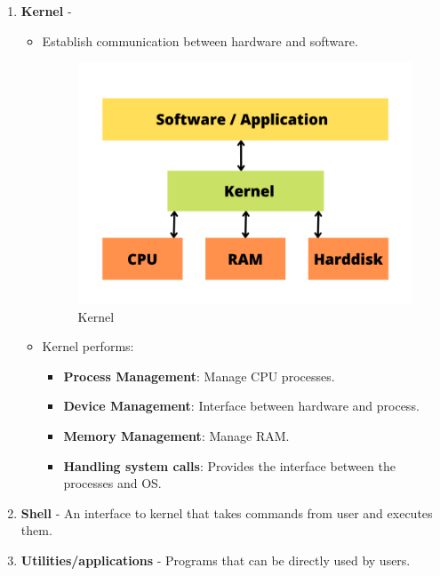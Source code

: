 \begin{flushleft}
	\begin{enumerate} 
		\item \textbf{Kernel} - 
		\begin{itemize}
			\item Establish communication between hardware and software.
			\begin{figure}[h!]
				\centering
				\includegraphics[scale=.4]{content/chapter1/images/kernel.png}
				\caption{Kernel}
				\label{fig:kernel}
			\end{figure}
			\item Kernel performs:
			\begin{itemize}
				\item \textbf{Process Management}: Manage CPU processes.
				\item \textbf{Device Management}: Interface between hardware and process.
				\item \textbf{Memory Management}: Manage RAM.
				\item \textbf{Handling system calls}: Provides the interface between the processes and OS.
			\end{itemize}			
		\end{itemize}
		\bigskip
		
		\item \textbf{Shell} - An interface to kernel that takes commands from user and executes them.
		\bigskip
		
		\item \textbf{Utilities/applications} - Programs that can be directly used by users.
	\end{enumerate}
\end{flushleft}

\newpage



